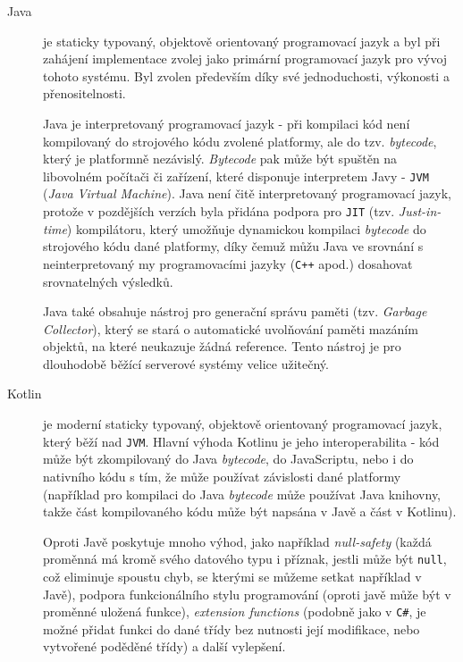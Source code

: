 \begin{description}
    \item[Java] je staticky typovaný, objektově orientovaný programovací jazyk a byl při zahájení implementace zvolej jako primární programovací jazyk pro vývoj tohoto systému. Byl zvolen především díky své jednoduchosti, výkonosti a přenositelnosti. 
    
    Java je interpretovaný programovací jazyk - při kompilaci kód není kompilovaný do strojového kódu zvolené platformy, ale do tzv. \textit{bytecode}, který je platformně nezávislý. \textit{Bytecode} pak může být spuštěn na libovolném počítači či zařízení, které disponuje interpretem Javy - \texttt{JVM} (\textit{Java Virtual Machine}). Java není čitě interpretovaný programovací jazyk, protože v pozdějších verzích byla přidána podpora pro \texttt{JIT} (tzv. \textit{Just-in-time}) kompilátoru, který umožňuje dynamickou kompilaci \textit{bytecode} do strojového kódu dané platformy, díky čemuž můžu Java ve srovnání s neinterpretovaný
    my programovacími jazyky (\texttt{C++} apod.) dosahovat srovnatelných výsledků.
    
    Java také obsahuje nástroj pro generační správu paměti (tzv. \textit{Garbage Collector}), který se stará o automatické uvolňování paměti mazáním objektů, na které neukazuje žádná reference. Tento nástroj je pro dlouhodobě běžící serverové systémy velice užitečný.

    \item[Kotlin]\label{chap:arch:technologie:kotlin} je moderní staticky typovaný, objektově orientovaný programovací jazyk, který běží nad \texttt{JVM}. Hlavní výhoda Kotlinu je jeho interoperabilita - kód může být zkompilovaný do Java \textit{bytecode}, do JavaScriptu, nebo i do nativního kódu s tím, že může používat závislosti dané platformy (například pro kompilaci do Java \textit{bytecode} může používat Java knihovny, takže část kompilovaného kódu může být napsána v Javě a část v Kotlinu).

    Oproti Javě poskytuje mnoho výhod, jako například \textit{null-safety} (každá proměnná má kromě svého datového typu i příznak, jestli může být \texttt{null}, což eliminuje spoustu chyb, se kterými se můžeme setkat například v Javě), podpora funkcionálního stylu programování (oproti javě může být v proměnné uložená funkce), \textit{extension functions} (podobně jako v \texttt{C\#}, je možné přidat funkci do dané třídy bez nutnosti její modifikace, nebo vytvořené poděděné třídy) a další vylepšení. 
    

\end{description}
